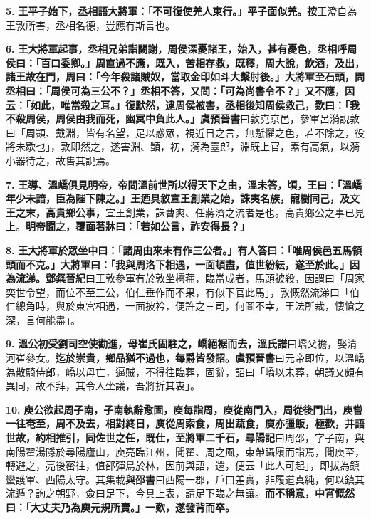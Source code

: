 \textbf{5.} \textbf{王平子始下，丞相語大將軍：「不可復使羌人東行。」平子面似羌。}{\footnotesize \textbf{按}王澄自為王敦所害，丞相名德，豈應有斯言也。}

\textbf{6.} \textbf{王大將軍起事，丞相兄弟詣闕謝，周侯深憂諸王，始入，甚有憂色，丞相呼周侯曰：「百口委卿。」周直過不應，既入，苦相存救，既釋，周大說，飲酒，及出，諸王故在門，周曰：「今年殺諸賊奴，當取金印如斗大繫肘後。」大將軍至石頭，問丞相曰：「周侯可為三公不？」丞相不答，又問：「可為尚書令不？」又不應，因云：「如此，唯當殺之耳。」復默然，逮周侯被害，丞相後知周侯救己，歎曰：「我不殺周侯，周侯由我而死，幽冥中負此人。」}{\footnotesize \textbf{虞預晉書}曰敦克京邑，參軍呂漪說敦曰「周顗、戴淵，皆有名望，足以惑眾，視近日之言，無慙懼之色，若不除之，役將未歇也」，敦即然之，遂害淵、顗，初，漪為臺郎，淵既上官，素有高氣，以漪小器待之，故售其說焉。}

\textbf{7.} \textbf{王導、溫嶠俱見明帝，帝問溫前世所以得天下之由，溫未答，頃，王曰：「溫嶠年少未諳，臣為陛下陳之。」王迺具敘宣王創業之始，誅夷名族，寵樹同己，及文王之末，高貴鄉公事，}{\footnotesize 宣王創業，誅曹爽、任蔣濟之流者是也。高貴鄉公之事已見上。}\textbf{明帝聞之，覆面著牀曰：「若如公言，祚安得長？」}

\textbf{8.} \textbf{王大將軍於眾坐中曰：「諸周由來未有作三公者。」有人答曰：「唯周侯邑五馬領頭而不克。」大將軍曰：「我與周洛下相遇，一面頓盡，值世紛紜，遂至於此。」因為流涕。}{\footnotesize \textbf{鄧粲晉紀}曰王敦參軍有於敦坐樗蒱，臨當成者，馬頭被殺，因謂曰「周家奕世令望，而位不至三公，伯仁垂作而不果，有似下官此馬」，敦慨然流涕曰「伯仁總角時，與於東宮相遇，一面披衿，便許之三司，何圖不幸，王法所裁，悽愴之深，言何能盡」。}

\textbf{9.} \textbf{溫公初受劉司空使勸進，母崔氏固駐之，嶠絕裾而去，}{\footnotesize \textbf{溫氏譜}曰嶠父襜，娶清河崔參女。}\textbf{迄於崇貴，鄉品猶不過也，每爵皆發詔。}{\footnotesize \textbf{虞預晉書}曰元帝即位，以溫嶠為散騎侍郎，嶠以母亡，逼賊，不得往臨葬，固辭，詔曰「嶠以未葬，朝議又頗有異同，故不拜，其令人坐議，吾將折其衷」。}

\textbf{10.} \textbf{庾公欲起周子南，子南執辭愈固，庾每詣周，庾從南門入，周從後門出，庾嘗一往奄至，周不及去，相對終日，庾從周索食，周出蔬食，庾亦彊飯，極歡，并語世故，約相推引，同佐世之任，既仕，至將軍二千石，}{\footnotesize \textbf{尋陽記}曰周邵，字子南，與南陽翟湯隱於尋陽廬山，庾亮臨江州，聞翟、周之風，束帶躡履而詣焉，聞庾至，轉避之，亮後密往，值邵彈鳥於林，因前與語，還，便云「此人可起」，即拔為鎮蠻護軍、西陽太守。其集載\textbf{與邵書}曰西陽一郡，戶口差實，非履道真純，何以鎮其流遁？詢之朝野，僉曰足下，今具上表，請足下臨之無讓。}\textbf{而不稱意，中宵慨然曰：「大丈夫乃為庾元規所賣。」一歎，遂發背而卒。}

